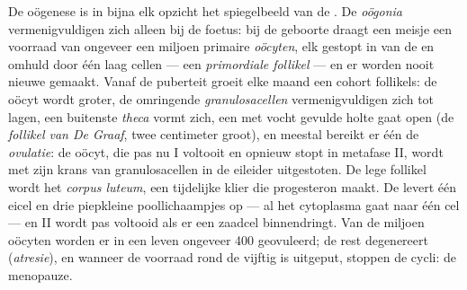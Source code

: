 \begin{definition}\label{def:b2:mammal-reproduction:ovary}
De oögenese is in bijna elk opzicht het spiegelbeeld van de
. De \emph{oögonia} vermenigvuldigen zich alleen bij de
foetus: bij de geboorte draagt een meisje een voorraad van ongeveer een
miljoen primaire \emph{oöcyten}, elk gestopt in  van de  en
omhuld door één laag cellen --- een \emph{primordiale follikel} --- en er
worden nooit nieuwe gemaakt. Vanaf de puberteit groeit elke maand een
cohort follikels: de oöcyt wordt groter, de omringende
\emph{granulosacellen} vermenigvuldigen zich tot lagen, een buitenste
\emph{theca} vormt zich, een met vocht gevulde holte gaat open (de
\emph{follikel van De Graaf}, twee centimeter groot), en meestal bereikt
er één de \emph{ovulatie}: de oöcyt, die pas nu  I voltooit en
opnieuw stopt in metafase II, wordt met zijn krans van granulosacellen in
de eileider uitgestoten. De lege follikel wordt het \emph{corpus luteum},
een tijdelijke klier die progesteron maakt. De  levert één eicel en
drie piepkleine poollichaampjes op --- al het cytoplasma gaat naar één cel
--- en  II wordt pas voltooid als er een zaadcel binnendringt. Van de
miljoen oöcyten worden er in een leven ongeveer \num{400} geovuleerd; de
rest degenereert (\emph{atresie}), en wanneer de voorraad rond de
vijftig is uitgeput, stoppen de cycli: de menopauze.
\end{definition}


